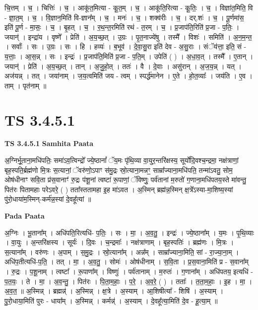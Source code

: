 \documentclass[17pt]{extarticle}
\begin{document}
चि॒त्तम् । च॒ । चित्तिः॑ । च॒ । आकू॑त॒मित्या - कू॒त॒म् । च॒ । आकू॑ति॒रित्या - कू॒तिः॒ । च॒ । विज्ञा॑त॒मिति॒ वि - ज्ञा॒त॒म् । च॒ । वि॒ज्ञान॒मिति॑ वि-ज्ञान᳚म् । च॒ । मनः॑ । च॒ । शक्व॑रीः । च॒ । दर्.शः॑ । च॒ । पू॒र्णमा॑स॒ इति॑ पू॒र्ण - मा॒सः॒ । च॒ । बृ॒हत् । च॒ । र॒थ॒न्त॒रमिति॑ रथं - त॒रम् । च॒ । प्र॒जाप॑ति॒रिति॑ प्र॒जा - प॒तिः॒ । जयान्॑ । इन्द्रा॑य । वृष्णे᳚ । प्रेति॑ । अ॒य॒च्छ॒त् । उ॒ग्रः । पृ॒त॒नाज्ये॑षु । तस्मै᳚ । विशः॑ । समिति॑ । अ॒न॒म॒न्त॒ । सर्वाः᳚ । सः । उ॒ग्रः । सः । हि । हव्यः॑ । ब॒भूव॑ । दे॒वा॒सु॒रा इति॑ देव - अ॒सु॒राः । संॅय॑त्ता॒ इति॒ सं - य॒त्ताः॒ । आ॒स॒न्न् । सः । इन्द्रः॑ । प्र॒जाप॑ति॒मिति॑ प्र॒जा - प॒ति॒म् । उपेति॑ ( ) । अ॒धा॒व॒त् । तस्मै᳚ । ए॒तान् । जयान्॑ । प्रेति॑ । अ॒य॒च्छ॒त् । तान् । अ॒जु॒हो॒त् । ततः॑ । वै । दे॒वाः । असु॑रान् । अ॒ज॒य॒न्न् । यत् । अज॑यन्न् । तत् । जया॑नाम् । ज॒य॒त्वमिति॑ जय - त्वम् । स्पर्द्ध॑मानेन । ए॒ते । हो॒त॒व्याः᳚ । जय॑ति । ए॒व । ताम् । पृत॑नाम् ॥  \newline





\section{ TS 3.4.5.1 }

\textbf{TS 3.4.5.1 } \newline
\textbf{Samhita Paata} \newline

अ॒ग्निर्भू॒ताना॒मधि॑पतिः॒ समा॑ऽव॒त्विन्द्रो᳚ ज्ये॒ष्ठानां᳚ ॅय॒मः पृ॑थि॒व्या वा॒युर॒न्तरि॑क्षस्य॒ सूर्यो॑दि॒वश्च॒न्द्रमा॒ नक्ष॑त्राणां॒ बृह॒स्पति॒र्ब्रह्म॑णो मि॒त्रः स॒त्यानां॒ ॅवरु॑णो॒ऽपाꣳ स॑मु॒द्रः स्रो॒त्याना॒मन्नꣳ॒॒ साम्रा᳚ज्याना॒मधि॑पति॒ तन्मा॑ऽवतु॒ सोम॒ ओष॑धीनाꣳ सवि॒ता प्र॑स॒वानाꣳ॑ रु॒द्रः प॑शू॒नां त्वष्टा॑ रू॒पाणां॒ ॅविष्णुः॒ पर्व॑तानां म॒रुतो॑ ग॒णाना॒मधि॑पतय॒स्ते मा॑वन्तु॒ पित॑रः पितामहाः परेऽवरे॒ ( ) तता᳚स्ततामहा इ॒ह मा॑ऽवत । अ॒स्मिन् ब्रह्म॑न्न॒स्मिन् क्ष॒त्रे᳚ऽस्या-मा॒शिष्य॒स्यां पु॑रो॒धाया॑म॒स्मिन्-कर्म॑न्न॒स्यां दे॒वहू᳚त्यां ॥ \newline

\textbf{Pada Paata} \newline

अ॒ग्निः । भू॒ताना᳚म् । अधि॑पति॒रित्यधि॑- प॒तिः॒ । सः । मा॒ । अ॒व॒तु॒ । इन्द्रः॑ । ज्ये॒ष्ठाना᳚म् । य॒मः । पृ॒थि॒व्याः । वा॒युः । अ॒न्तरि॑क्षस्य । सूर्यः॑ । दि॒वः । च॒न्द्रमाः᳚ । नक्ष॑त्राणाम् । बृह॒स्पतिः॑ । ब्रह्म॑णः । मि॒त्रः । स॒त्याना᳚म् । वरु॑णः । अ॒पाम् । स॒मु॒द्रः । स्रो॒त्याना᳚म् । अन्न᳚म् । साम्रा᳚ज्याना॒मिति॒ सां - रा॒ज्या॒ना॒म् । अधि॑प॒तीत्यधि॑-प॒ति॒ । तत् । मा॒ । अ॒व॒तु॒ । सोमः॑ । ओष॑धीनाम् । स॒वि॒ता । प्र॒स॒वाना॒मिति॑ प्र - स॒वाना᳚म् । रु॒द्रः । प॒शू॒नाम् । त्वष्टा᳚ । रू॒पाणा᳚म् । विष्णुः॑ । पर्व॑तानाम् । म॒रुतः॑ । ग॒णाना᳚म् । अधि॑पतय॒ इत्यधि॑ - प॒त॒यः॒ । ते । मा॒ । अ॒व॒न्तु॒ । पित॑रः । पि॒ता॒म॒हाः॒ । प॒रे॒ । अ॒व॒रे॒ ( ) । तताः᳚ । त॒ता॒म॒हाः॒ । इ॒ह । मा॒ । अ॒व॒त॒ ॥ अ॒स्मिन्न् । ब्रह्मन्न्॑ । अ॒स्मिन्न् । क्ष॒त्रे । अ॒स्याम् । आ॒शिषीत्या᳚ - शिषि॑ । अ॒स्याम् । पु॒रो॒धाया॒मिति॑ पुरः - धाया᳚म् । अ॒स्मिन्न् । कर्मन्न्॑ । अ॒स्याम् । दे॒वहू᳚त्या॒मिति॑ दे॒व - हू॒त्या॒म् ॥  \newline
\end{document}
